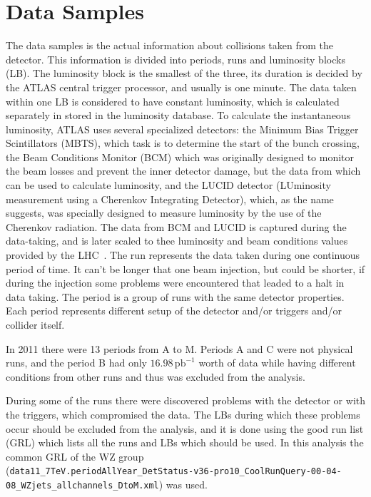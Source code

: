 \chapter{Data Samples}
\label{sec:DataSamples}

The data samples is the actual information about collisions taken from the detector. This information is divided into periods, runs and luminosity blocks (LB). The luminosity block is the smallest of the three, its duration is decided by the ATLAS central trigger processor, and usually is one minute. The data taken within one LB is considered to have constant luminosity, which is calculated separately in stored in the luminosity database. To calculate the instantaneous luminosity, ATLAS uses several specialized detectors: the Minimum  Bias Trigger Scintillators (MBTS), which task is to determine the start of the bunch crossing, the Beam Conditions Monitor (BCM) which was originally designed to monitor the beam losses and prevent the inner detector damage, but the data from which can be used to calculate luminosity, and the LUCID detector (LUminosity measurement using a Cherenkov Integrating Detector), which, as the name suggests, was specially designed to measure luminosity by the use of the Cherenkov radiation. The data from BCM and LUCID is captured during the data-taking, and is later scaled to thee luminosity and beam conditions values provided by the LHC~\cite{lib:lumi}. The run represents the data taken during one continuous period of time. It can't be longer that one beam injection, but could be shorter, if during the injection some problems were encountered that leaded to a halt in data taking. The period is a group of runs with the same detector properties. Each period represents different setup of the detector and/or triggers and/or collider itself.

In 2011 there were 13 periods from A to M. Periods A and C were not physical runs, and the period B had only \ensuremath{16.98\,\mathrm{pb}^{-1}} worth of data while having different conditions from other runs and thus was excluded from the analysis.

During some of the runs there were discovered problems with the detector or with the triggers, which compromised the data. The LBs during which these problems occur should be excluded from the analysis, and it is done using the good run list (GRL) which lists all the runs and LBs which should be used. In this analysis the common GRL of the WZ group\\
(\texttt{\footnotesize data11\_7TeV.periodAllYear\_DetStatus-v36-pro10\_CoolRunQuery-00-04-08\_WZjets\_allchannels\_DtoM.xml}) was used.

